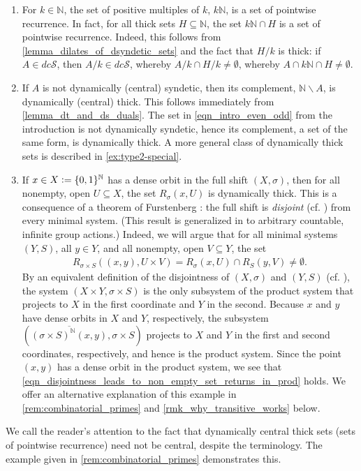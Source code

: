 \documentclass[letter,11pt]{article}
\theoremstyle{plain}
\theoremstyle{definition}
\theoremstyle{plain}
\theoremstyle{plain}
\numberwithin{equation}{section}
\newcommand{\N}{\mathbb{N}}
\newcommand{\defeq}{\vcentcolon=}
\renewcommand{\setminus}{\backslash}
\newcommand{\dcsyndetic}{dc\mathcal{S}}
\begin{document}
\begin{enumerate}
    \item For $k \in \N$, the set of positive multiples of $k$, $k\N$, is a set of pointwise recurrence. In fact, for all thick sets $H \subseteq \N$, the set $k \N \cap H$ is a set of pointwise recurrence. Indeed, this follows from \cref{lemma_dilates_of_dsyndetic_sets} and the fact that $H / k$ is thick: if $A \in \dcsyndetic$, then $A / k \in \dcsyndetic$, whereby $A / k \cap H / k \neq \emptyset$, whereby $A \cap k\N \cap H \neq \emptyset$.
    

    \item If $A$ is not dynamically (central) syndetic, then its complement, $\N \setminus A$, is dynamically (central) thick.  This follows immediately from \cref{lemma_dt_and_ds_duals}.  The set in \eqref{eqn_intro_even_odd} from the introduction is not dynamically syndetic, hence its complement, a set of the same form, is dynamically thick.  A more general class of dynamically thick sets is described in \cref{ex:type2-special}.

    \item \label{ex_transitive_point_visit_times} If $x \in X \defeq \{0,1\}^{\N}$ has a dense orbit in the full shift $(X,\sigma)$, then for all nonempty, open $U \subseteq X$, the set $R_\sigma(x,U)$ is dynamically thick. This is a consequence of a theorem of Furstenberg \cite[Thm. II.2]{Furstenberg-disjointness}: the full shift is \emph{disjoint} (cf. \cite[Def. II.1]{Furstenberg-disjointness}) from every minimal system.  (This result is generalized in \cite[Thm. 6.2]{glasner_tsankov_weiss_zucker_2021} to arbitrary countable, infinite group actions.) Indeed, we will argue that for all minimal systems $(Y,S)$, all $y \in Y$, and all nonempty, open $V \subseteq Y$, the set
    \begin{align}
        \label{eqn_disjointness_leads_to_non_empty_set_returns_in_prod}
        R_{\sigma \times S} ((x,y), U \times V) = 
        R_\sigma(x,U) \cap R_S(y,V) \neq \emptyset.
    \end{align}
    By an equivalent definition of the disjointness of $(X,\sigma)$ and $(Y,S)$ (cf. \cite[Lemma II.1]{Furstenberg-disjointness}), the system $(X \times Y, \sigma \times S)$ is the only subsystem of the product system that projects to $X$ in the first coordinate and $Y$ in the second.  Because $x$ and $y$ have dense orbits in $X$ and $Y$, respectively, the subsystem $(\overline{(\sigma \times S)^{\N}(x,y)}, \sigma \times S)$ projects to $X$ and $Y$ in the first and second coordinates, respectively, and hence is the product system.  Since the point $(x,y)$ has a dense orbit in the product system, we see that \eqref{eqn_disjointness_leads_to_non_empty_set_returns_in_prod} holds.  We offer an alternative explanation of this example in \cref{rem:combinatorial_primes} and \cref{rmk_why_transitive_works} below.
\end{enumerate}
We call the reader's attention to the fact that dynamically central thick sets (sets of pointwise recurrence) need not be central, despite the terminology.  The example given in \cref{rem:combinatorial_primes} demonstrates this.
\end{document}
